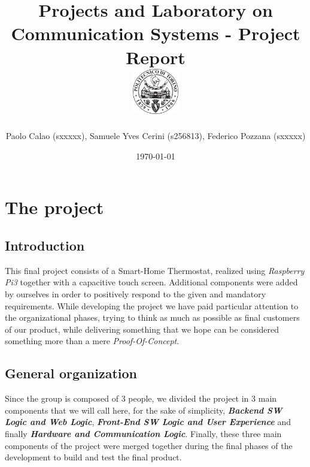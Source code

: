 \documentclass[a4paper]{article}
\begin{document}
    \title{
        Projects and Laboratory on Communication Systems - Project Report \\[0.5cm]
        \includegraphics[width=0.15\textwidth]{PoliLogo.png}%
    }
    \author{Paolo Calao (sxxxxx), Samuele Yves Cerini (s256813), Federico Pozzana (sxxxxx)}

    \date{\today}
    \maketitle
    
    
    \tableofcontents    
    
    \section{The project}

        \subsection{Introduction}
        This final project consists of a Smart-Home Thermostat, realized using \emph{Raspberry Pi3} together with a capacitive touch screen.
        Additional components were added by ourselves in order to positively respond to the given and mandatory requirements.
        While developing the project we have paid particular attention to the organizational phases, trying to think as much as possible as final customers of our product, while delivering something that we hope can be considered something more than a mere \emph{Proof-Of-Concept}.
            
        \subsection{General organization}
        Since the group is composed of 3 people, we divided the project in 3 main components that we will call here, for the sake of simplicity, \textbf{\emph{Backend SW Logic and Web Logic}}, \textbf{\emph{Front-End SW Logic and User Experience}} and finally \textbf{\emph{Hardware and Communication Logic}}.
        Finally, these three main components of the project were merged together during the final phases of the development to build and test the final product.
\end{document}
